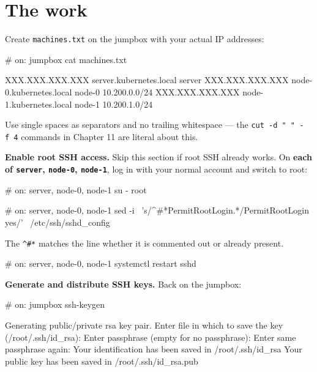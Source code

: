 \documentclass[11pt,oneside]{report}
\begin{document}
\hypertarget{the-work-2}{%
\section{The
work}\label{the-work-2}}

Create
\texttt{machines.txt}
on the jumpbox with
your actual IP
addresses:

\begin{cmdlst}
# on: jumpbox
cat machines.txt
\end{cmdlst}

\begin{outlst}
XXX.XXX.XXX.XXX server.kubernetes.local server
XXX.XXX.XXX.XXX node-0.kubernetes.local node-0 10.200.0.0/24
XXX.XXX.XXX.XXX node-1.kubernetes.local node-1 10.200.1.0/24
\end{outlst}

Use single spaces as
separators and no
trailing whitespace
--- the
\texttt{cut\ -d\ "\ "\ -f\ 4}
commands in Chapter
11 are literal about
this.

\textbf{Enable root
SSH access.} Skip
this section if root
SSH already works.
On \textbf{each of
\texttt{server},
\texttt{node-0},
\texttt{node-1}},
log in with your
normal account and
switch to root:

\begin{cmdlst}
# on: server, node-0, node-1
su - root
\end{cmdlst}

\begin{cmdlst}
# on: server, node-0, node-1
sed -i \
  's/^#*PermitRootLogin.*/PermitRootLogin yes/' \
  /etc/ssh/sshd_config
\end{cmdlst}

The \texttt{\^{}\#*}
matches the line
whether it is
commented out or
already present.

\begin{cmdlst}
# on: server, node-0, node-1
systemctl restart sshd
\end{cmdlst}

\textbf{Generate and
distribute SSH
keys.} Back on the
jumpbox:

\begin{cmdlst}
# on: jumpbox
ssh-keygen
\end{cmdlst}

\begin{outlst}
Generating public/private rsa key pair.
Enter file in which to save the key (/root/.ssh/id_rsa):
Enter passphrase (empty for no passphrase):
Enter same passphrase again:
Your identification has been saved in /root/.ssh/id_rsa
Your public key has been saved in /root/.ssh/id_rsa.pub
\end{outlst}
\end{document}
